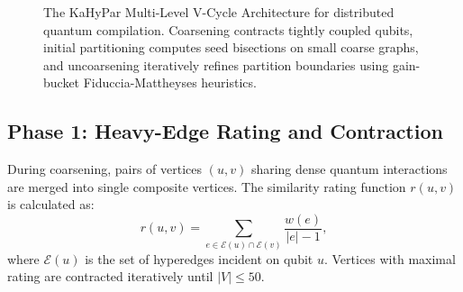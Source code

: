 \begin{figure}[htbp]
    \caption{The KaHyPar Multi-Level V-Cycle Architecture for distributed quantum compilation. Coarsening contracts tightly coupled qubits, initial partitioning computes seed bisections on small coarse graphs, and uncoarsening iteratively refines partition boundaries using gain-bucket Fiduccia-Mattheyses heuristics.}
    \label{fig:kahypar_v_cycle}
\end{figure}

\subsection{Phase 1: Heavy-Edge Rating and Contraction}
During coarsening, pairs of vertices $(u, v)$ sharing dense quantum interactions are merged into single composite vertices. The similarity rating function $r(u, v)$ is calculated as:
\begin{equation}
    r(u, v) = \sum_{e \in \mathcal{E}(u) \cap \mathcal{E}(v)} \frac{w(e)}{|e| - 1},
    \label{eq:heavy_edge_rating}
\end{equation}
where $\mathcal{E}(u)$ is the set of hyperedges incident on qubit $u$. Vertices with maximal rating are contracted iteratively until $|V| \le 50$.

